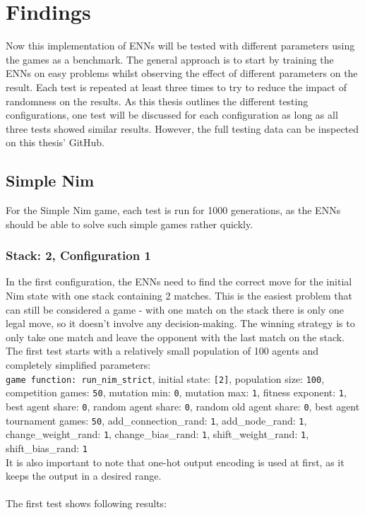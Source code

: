 \section{Findings}\label{sec:first-findings}
Now this implementation of ENNs will be tested with different parameters using the games as a benchmark.
The general approach is to start by training the ENNs on easy problems whilst observing the effect of different parameters on the result.
Each test is repeated at least three times to try to reduce the impact of randomness on the results.
As this thesis outlines the different testing configurations, one test will be discussed for each configuration as long as all three tests showed similar results.
However, the full testing data can be inspected on this thesis' GitHub\cite{RustENN}.

\subsection{Simple Nim}\label{subsec:simple-nim-results}
For the Simple Nim game, each test is run for 1000 generations, as the ENNs should be able to solve such simple games rather quickly.

\subsubsection{Stack: 2, Configuration 1}
In the first configuration, the ENNs need to find the correct move for the initial Nim state with one stack containing 2 matches.
This is the easiest problem that can still be considered a game - with one match on the stack there is only one legal move, so it doesn't involve any decision-making.
The winning strategy is to only take one match and leave the opponent with the last match on the stack.
The first test starts with a relatively small population of 100 agents and completely simplified parameters:
\\
\texttt{game function: run\_nim\_strict}, initial state: \texttt{[2]}, population size: \texttt{100}, competition games: \texttt{50}, mutation min: \texttt{0}, mutation max: \texttt{1}, fitness exponent: \texttt{1}, best agent share:
\texttt{0}, random agent share: \texttt{0}, random old agent share: \texttt{0}, best agent tournament games: \texttt{50}, add\_connection\_rand: \texttt{1}, add\_node\_rand: \texttt{1}, change\_weight\_rand: \texttt{1}, change\_bias\_rand: \texttt{1}, shift\_weight\_rand: \texttt{1}, shift\_bias\_rand: \texttt{1}\\
It is also important to note that one-hot output encoding is used at first, as it keeps the output in a desired range.
\\ \\
The first test shows following results:
\\
\newcommand{\csvpath}{../data/simple_nim/stack_2/t_1/stats.csv} %

